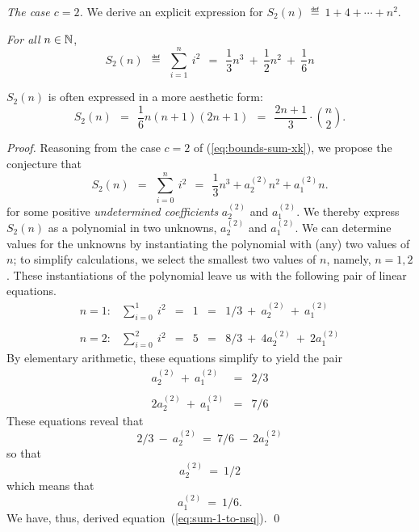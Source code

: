 {\it The case $c=2$.}
%
We derive an explicit expression for $S_2(n) \ \eqdef \  1 + 4 +
\cdots + n^2$.

\begin{prop}
{\em For all} $n \in \mathbb{N}$,
\begin{equation}
\label{eq:sum-1-to-nsq}
S_2(n) \ \ \eqdef \ \ \sum_{i=1}^n \ i^2 
\ \ = \ \ \frac{1}{3} n^3 \ + \ \frac{1}{2} n^2 \ + \ \frac{1}{6} n
\end{equation}
\end{prop}

\noindent
$S_2(n)$ is often expressed in a more aesthetic form:
\[ S_2(n) \ \ = \ \
\frac{1}{6} n (n+1)(2n+1) \ \  = \ \
\frac{2n+1}{3} \cdot {n \choose 2}.
\]

\begin{proof}
Reasoning from the case $c=2$ of (\ref{eq:bounds-sum-xk}), we
propose the conjecture that
\begin{equation}
\label{eq:symbolic-cubic}
S_2(n) \ \ = \ \
\sum_{i=0}^n \ i^2 \ \ = \ \ \frac{1}{3} n^3 + a^{(2)}_2 n^2 + a^{(2)}_1 n.
\end{equation}
for some positive {\it undetermined coefficients} $a^{(2)}_2$ and
$a^{(2)}_1$.  We thereby express $S_2(n)$ as a polynomial in two
unknowns, $a^{(2)}_2$ and $a^{(2)}_1$.  We can determine values for
the unknowns by instantiating the polynomial with (any) two values of
$n$; to simplify calculations, we select the smallest two values of
$n$, namely, $n = 1,2$.  These instantiations of the polynomial leave
us with the following pair of linear equations.
\[
\begin{array}{cccccl}
n=1: & \sum_{i=0}^1 \ i^2
   & = & 1 & = &
1/3 \ + \ a^{(2)}_2 \ + \ a^{(2)}_1 \\
 & & & & & \\
n=2: & \sum_{i=0}^2 \ i^2
   & = & 5 & = &
8/3 \ + \ 4 a^{(2)}_2 \ + \ 2 a^{(2)}_1
\end{array}
\]
By elementary arithmetic, these equations simplify to yield the pair
\[
\begin{array}{ccc}
a^{(2)}_2 \ + \ a^{(2)}_1   & = & 2/3 \\
 & & \\
2 a^{(2)}_2 \ + \ a^{(2)}_1 & = & 7/6
\end{array}
\]
These equations reveal that
\[ 2/3 \ - \ a^{(2)}_2 \ = \ 7/6 \ - \ 2 a^{(2)}_2 \]
so that 
\[ a^{(2)}_2 \ = \ 1/2 \]
which means that
\[ a^{(2)}_1 \ = \ 1/6. \]
We have, thus, derived equation~(\ref{eq:sum-1-to-nsq}).  \qed
\end{proof}

